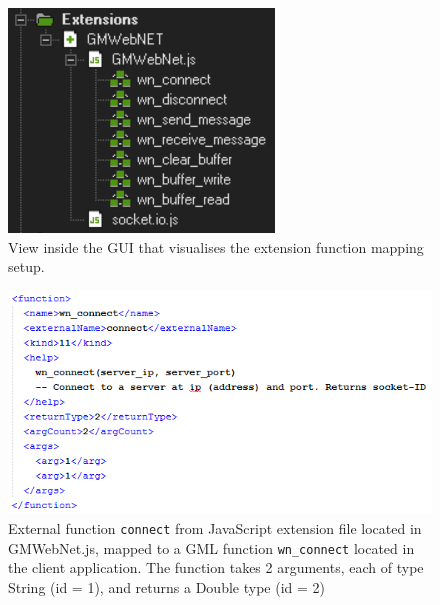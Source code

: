 \documentclass[bsc, 12pt, twoside, singlespacing, parskip, abbrevs, notimes, normalheadings, logo]{styles/infthesis}
\begin{document}
\begin{figure}[H]
	\centering
	\includegraphics[scale=1.2]{images/extensions_folder.png}
	\caption{View inside the GUI that visualises the extension function mapping setup.}
	\label{fig:extension_folder}
	\vspace{1em}
\end{figure}

\begin{figure}[H]
	\centering
	\includegraphics[scale=1.2]{images/xml_mapping.png}
	\caption{External function \texttt{connect} from JavaScript extension file located in GMWebNet.js, mapped to a GML function \texttt{wn\_connect} located in the client application. The function takes 2 arguments, each of type String (id = 1), and returns a Double type (id = 2)}
	\label{fig:xml_mapping}
	\vspace{1em}
\end{figure}
\end{document}
